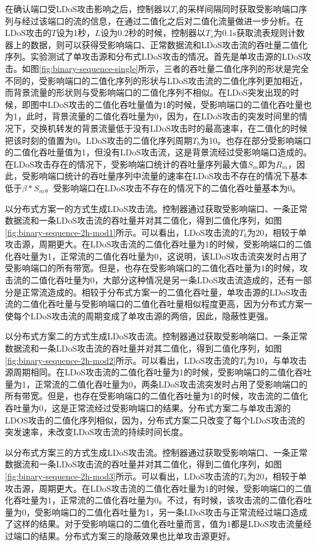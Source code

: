 在确认端口受LDoS攻击影响之后，控制器以$T_s$的采样间隔同时获取受影响端口序列与经过该端口的流的信息，在通过二值化之后对二值化流量做进一步分析。在LDoS攻击的$T$设为1秒，$L$设为0.2秒的时候，控制器以$T_s$为0.1s获取流表规则计数器上的数据，则可以获得受影响端口、正常数据流和LDoS攻击流的吞吐量二值化序列。实验测试了单攻击源和分布式LDoS攻击的情况。首先是单攻击源的LDoS攻击。如图\ref{fig:binary-sequence-single}所示，三者的吞吐量二值化序列的形状是完全不同的，受影响端口的二值化序列的形状与LDoS攻击流的二值化序列更加相近，而背景流量的形状则与受影响端口的二值化序列不相似。在LDoS突发出现的时候，即图中LDoS攻击的二值化吞吐量值为1的时候，受影响端口的二值化吞吐量也为1，此时，背景流量的二值化吞吐量为0，因为，在LDoS攻击的突发时间里的情况下，交换机转发的背景流量低于没有LDoS攻击时的最高速率，在二值化的时候把该时刻的值置为0。LDoS攻击的二值化序列周期$T_b$为10。也存在部分受影响端口的二值化吞吐量值为1，但没有LDoS攻击流，这是背景流经过受影响端口造成的。在LDoS攻击存在的情况下，受影响端口统计的吞吐量序列最大值$S_m$即为$R_m$，因此，受影响端口统计的吞吐量序列中流量的速率在LDoS攻击不存在的情况下基本低于$\beta * S_m$。受影响端口在LDoS攻击不存在的情况下的二值化吞吐量基本为0。

以分布式方案一的方式生成LDoS攻击流。控制器通过获取受影响端口、一条正常数据流和一条LDoS攻击流的吞吐量并对其二值化，得到二值化序列，如图\ref{fig:binary-sequence-2h-mod1}所示。可以看出，LDoS攻击流的$T_b$为20，相较于单攻击源，周期更大。在LDoS攻击流的二值化吞吐量为1的时候，受影响端口的二值化吞吐量为1，正常流的二值化吞吐量为0，这说明，该LDoS攻击流突发时占用了受影响端口的所有带宽。但是，也存在受影响端口的二值化吞吐量为1的时候，攻击流的二值化吞吐量为0，大部分这种情况是另一条LDoS攻击流造成的，还有一部分是正常流造成的。相较于分布式方案一的二值化吞吐量，单攻击源的LDoS攻击流的二值化吞吐量与受影响端口的二值化吞吐量相似程度更高，因为分布式方案一使每个LDoS攻击流的周期变成了单攻击源的两倍，因此，隐蔽性更强。


以分布式方案二的方式生成LDoS攻击流。控制器通过获取受影响端口、一条正常数据流和一条LDoS攻击流的吞吐量并对其二值化，得到二值化序列，如图\ref{fig:binary-sequence-2h-mod2}所示。可以看出，LDoS攻击流的$T_b$为10，与单攻击源周期相同。在LDoS攻击流的二值化吞吐量为1的时候，受影响端口的二值化吞吐量为1，正常流的二值化吞吐量为0，两条LDoS攻击流突发时占用了受影响端口的所有带宽。但是，也存在受影响端口的二值化吞吐量为1的时候，攻击流的二值化吞吐量为0，这是正常流经过受影响端口的结果。分布式方案二与单攻击源的LDOS攻击的二值化序列相似，因为，分布式方案二只改变了每个LDoS攻击流的突发速率，未改变LDoS攻击流的持续时间长度。

以分布式方案三的方式生成LDoS攻击流。控制器通过获取受影响端口、一条正常数据流和一条LDoS攻击流的吞吐量并对其二值化，得到二值化序列，如图\ref{fig:binary-sequence-2h-mod3}所示。可以看出，LDoS攻击流的$T_b$为20，相较于单攻击源，周期更大。在LDoS攻击流的二值化吞吐量为1的时候，受影响端口的二值化吞吐量为1，正常流的二值化吞吐量为0。不过，有时候，该攻击流的二值化吞吐量为0，受影响端口的二值化吞吐量为1，另一条LDoS攻击与正常流经过端口造成了这样的结果。对于受影响端口的二值化吞吐量而言，值为1都是LDoS攻击流量经过端口的结果。分布式方案三的隐蔽效果也比单攻击源更好。


